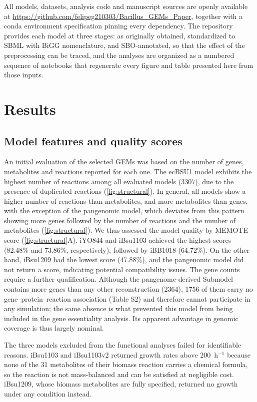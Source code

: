 \documentclass[11pt, a4paper]{article}
\begin{document}
All models, datasets, analysis code and manuscript sources are openly available at \url{https://github.com/felipeg210303/Bacillus_GEMs_Paper}, together with a conda environment specification pinning every dependency. The repository provides each model at three stages: as originally obtained, standardized to SBML with BiGG nomenclature, and SBO-annotated, so that the effect of the preprocessing can be traced, and the analyses are organized as a numbered sequence of notebooks that regenerate every figure and table presented here from those inputs.


\section{Results}

\subsection{Model features and quality scores}
An initial evaluation of the selected GEMs was based on the number of genes, metabolites and reactions reported for each one. The ecBSU1 model exhibits the highest number of reactions among all evaluated models (3307), due to the presence of duplicated reactions (\autoref{fig:structural}). In general, all models show a higher number of reactions than metabolites, and more metabolites than genes, with the exception of the pangenomic model, which deviates from this pattern showing more genes followed by the number of reactions and the number of metabolites (\autoref{fig:structural}).
We thus assessed the model quality by MEMOTE score (\autoref{fig:structural}A). iYO844 and iBsu1103 achieved the highest scores (82.48\% and 73.86\%, respectively), followed by iBB1018 (64.72\%). On the other hand, iBsu1209 had the lowest score (47.88\%), and the pangenomic model did not return a score, indicating potential compatibility issues.
The gene counts require a further qualification. Although the pangenome-derived Submodel contains more genes than any other reconstruction (2364), 1756 of them carry no gene--protein--reaction association (Table S2) and therefore cannot participate in any simulation; the same absence is what prevented this model from being included in the gene essentiality analysis. Its apparent advantage in genomic coverage is thus largely nominal.

The three models excluded from the functional analyses failed for identifiable reasons. iBsu1103 and iBsu1103v2 returned growth rates above 200~h$^{-1}$ because none of the 31 metabolites of their biomass reaction carries a chemical formula, so the reaction is not mass-balanced and can be satisfied at negligible cost. iBsu1209, whose biomass metabolites are fully specified, returned no growth under any condition instead.
\end{document}
